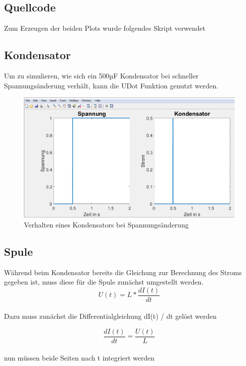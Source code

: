 \documentclass[%
  a4paper, %
  12pt, %
   article, %
  titlepage
]{scrartcl}
\begin{document}
\subsection{Quellcode}

Zum Erzeugen der beiden Plots wurde folgendes Skript verwendet
 


\newpage
\subsection{Kondensator}

Um zu simulieren, wie sich ein 500µF Kondensator bei schneller Spannungsänderung verhält, kann die UDot Funktion genutzt werden.

\begin{figure}[h]
\includegraphics[width=\textwidth]{plot3.png}
\caption{Verhalten eines Kondensators bei Spannungsänderung}
\label{fig5}
\end{figure}

\newpage

\subsection{Spule}

Während beim Kondensator bereits die Gleichung zur Berechnung des Stroms gegeben ist, muss diese für die Spule zunächst umgestellt werden.
\begin{equation}
U(t) =  L*\frac{dI(t)}{dt}
\end{equation}
\\
Dazu muss zunächst die Differentialgleichung dI(t) / dt gelöst werden

\begin{equation}
\frac{dI(t)}{dt} = \frac{U(t)}{L}
\end{equation}
\\
nun müssen beide Seiten nach t integriert werden
\end{document}
